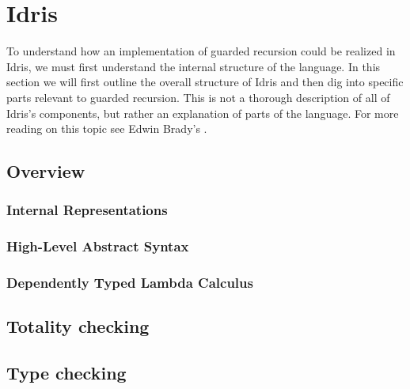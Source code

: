 \chapter{Idris}
To understand how an implementation of guarded recursion could be realized in Idris, we must first understand the internal structure of the language. In this section we will first outline the overall structure of Idris and then dig into specific parts relevant to guarded recursion. This is not a thorough description of all of Idris's components, but rather an explanation of parts of the language. For more reading on this topic see Edwin Brady's .%
\section{Overview}
\subsection{Internal Representations}
\subsection{High-Level Abstract Syntax}
\subsection{Dependently Typed Lambda Calculus}
\section{Totality checking}
\section{Type checking}

